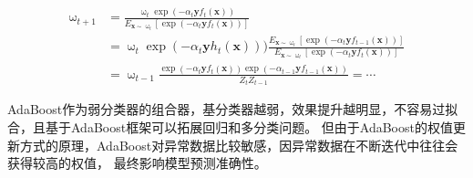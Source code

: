 \documentclass[a4paper]{article}
\begin{document}
\begin{itemize}
\begin{align*}
		   				\upomega_{t+1} 	
		   					& = \frac{\upomega_t\exp(-\alpha_t\textbf{y}f_t(\textbf{x}))}{E_{\textbf{x}\sim\upomega_t}[\exp(-\alpha_t\textbf{y}f_{t}(\textbf{x}))]} \\
		   		   			& = \upomega_t\exp(-\alpha_t\textbf{y}h_{t}(\textbf{x})))\frac{E_{\textbf{x}\sim \upomega_t}
		   		   				[\exp(-\alpha_t\textbf{y}f_{t-1}(\textbf{x}))]}{E_{\textbf{x}\sim \upomega_t}[\exp(-\alpha_t\textbf{y}f_{t}(\textbf{x}))]}\\
		   		   			& = \upomega_{t-1}\frac{\exp(-\alpha_t\textbf{y}f_t(\textbf{x}))\exp(-\alpha_{t-1}\textbf{y}f_{t-1}(\textbf{x}))}{Z_tZ_{t-1}}=\cdots
					\end{align*}
			\end{itemize}
			\par AdaBoost作为弱分类器的组合器，基分类器越弱，效果提升越明显，不容易过拟合，且基于AdaBoost框架可以拓展回归和多分类问题。
			但由于AdaBoost的权值更新方式的原理，AdaBoost对异常数据比较敏感，因异常数据在不断迭代中往往会获得较高的权值，
			最终影响模型预测准确性。
\end{document}
